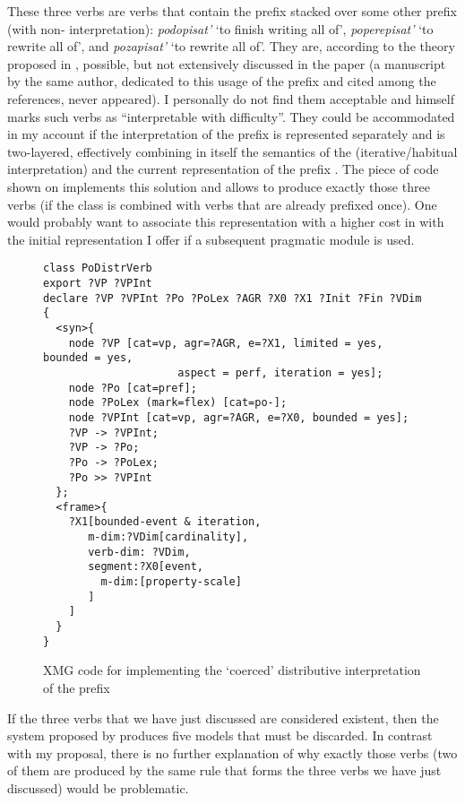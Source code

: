 These three verbs are verbs that contain the  prefix  stacked over some other prefix (with non- interpretation): \textit{podopisat'} `to finish writing all of', \textit{poperepisat'} `to rewrite all of', and  \textit{pozapisat'} `to rewrite all of'. They are, according to the theory proposed in \citet{Tatevosov:09}, possible, but not extensively discussed in the paper (a manuscript by the same author, dedicated to this usage of the prefix and cited among the references, never appeared). I personally do not find them acceptable and \citet[143]{Tatevosov:09} himself marks such verbs as ``interpretable with difficulty''. They could be accommodated in my account if the  interpretation of the prefix  is represented separately and is two-layered, effectively combining in itself the semantics of the  (iterative/habitual interpretation) and the current representation of the prefix . The piece of code shown on  implements this solution and allows to produce exactly those three verbs (if the class is combined with verbs that are already prefixed once). One would probably want to associate this representation with a higher cost in  with the initial representation I offer if a subsequent pragmatic module is used.

\begin{figure}
\begin{lstlisting}[style=xmg,basicstyle=\ttfamily\small]
class PoDistrVerb
export ?VP ?VPInt
declare ?VP ?VPInt ?Po ?PoLex ?AGR ?X0 ?X1 ?Init ?Fin ?VDim
{
  <syn>{
    node ?VP [cat=vp, agr=?AGR, e=?X1, limited = yes, bounded = yes, 
    				 aspect = perf, iteration = yes];
    node ?Po [cat=pref];
    node ?PoLex (mark=flex) [cat=po-];
    node ?VPInt [cat=vp, agr=?AGR, e=?X0, bounded = yes];
    ?VP -> ?VPInt;
    ?VP -> ?Po;
    ?Po -> ?PoLex;
    ?Po >> ?VPInt
  };
  <frame>{
    ?X1[bounded-event & iteration,
       m-dim:?VDim[cardinality],
       verb-dim: ?VDim,
       segment:?X0[event,
         m-dim:[property-scale]
       ]
    ]
  }
}
\end{lstlisting}
\caption{XMG code for implementing the `coerced' distributive interpretation of the prefix \label{xmg:podistr}}
\end{figure}

If the three verbs that we have just discussed are considered existent, then the  system proposed by \citet{Tatevosov:09} produces five models that must be discarded. In contrast with my proposal, there is no further explanation of why exactly those verbs (two of them are produced by the same rule that forms the three verbs we have just discussed) would be problematic.

